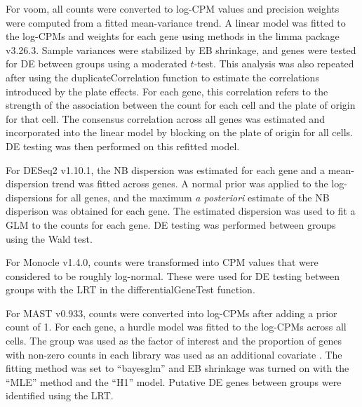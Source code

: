 \documentclass{article}
\begin{document}
For voom, all counts were converted to log-CPM values and precision weights were computed from a fitted mean-variance trend.
A linear model was fitted to the log-CPMs and weights for each gene using methods in the limma package v3.26.3.
Sample variances were stabilized by EB shrinkage, and genes were tested for DE between groups using a moderated $t$-test.
This analysis was also repeated after using the duplicateCorrelation function \citep{smyth2005use} to estimate the correlations introduced by the plate effects.
For each gene, this correlation refers to the strength of the association between the count for each cell and the plate of origin for that cell.
The consensus correlation across all genes was estimated and incorporated into the linear model by blocking on the plate of origin for all cells.
DE testing was then performed on this refitted model.

For DESeq2 v1.10.1, the NB dispersion was estimated for each gene and a mean-dispersion trend was fitted across genes.
A normal prior was applied to the log-dispersions for all genes, and the maximum \textit{a posteriori} estimate of the NB disperison was obtained for each gene.
The estimated dispersion was used to fit a GLM to the counts for each gene.
DE testing was performed between groups using the Wald test.

For Monocle v1.4.0, counts were transformed into CPM values that were considered to be roughly log-normal.
These were used for DE testing between groups with the LRT in the differentialGeneTest function.

For MAST v0.933, counts were converted into log-CPMs after adding a prior count of 1.
For each gene, a hurdle model was fitted to the log-CPMs across all cells. 
The group was used as the factor of interest and the proportion of genes with non-zero counts in each library was used as an additional covariate \citep{finak2015mast}.
The fitting method was set to ``bayesglm'' and EB shrinkage was turned on with the ``MLE'' method and the ``H1'' model.
Putative DE genes between groups were identified using the LRT.
\end{document}
